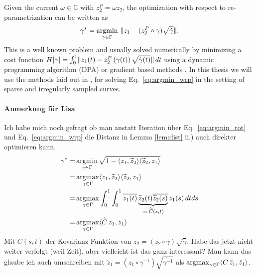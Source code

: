 Given the current $\omega \in \mathbb{C}$ with $z_2^P = \omega z_2$, the optimization with respect to re-parametrization can be written as
\begin{equation}
  \label{eq:argmin_wrp}
  \gamma^* = \operatorname*{argmin}_{\gamma \in \Gamma}\,\, \lVert z_1 - (z_2^P \circ \gamma) \sqrt{\dot\gamma}\rVert.
\end{equation}
This is a well known problem and usually solved numerically by minimizing a cost function $H[\gamma] = \int_0^1 \lVert z_1(t) - z_2^P\left( \gamma(t) \right) \sqrt{\dot\gamma(t)}\rVert\, dt$ using a dynamic programming algorithm (DPA) or gradient based methods \parencite[see][]{SrivastavaEtAl2011}.
In this thesis we will use the methods laid out in \cite{Steyer2021}, for solving Eq.\ \ref{eq:argmin_wrp} in the setting of sparse and irregularly sampled curves.

\paragraph{Anmerkung für Lisa}
Ich habe mich noch gefragt ob man anstatt Iteration über Eq.\ \ref{eq:argmin_rot} und Eq.\ \ref{eq:argmin_wrp} die Distanz in Lemma \ref{lem:dist} ii.) auch direkter optimieren kann.
\begin{align*}
  \gamma^* = & \operatorname*{argmin}_{\gamma \in \Gamma} \sqrt{1 - \langle z_1, \widetilde z_2 \rangle \langle \widetilde z_2, z_1 \rangle } \\
    = & \operatorname*{argmax}_{\gamma \in \Gamma} \langle z_1, \widetilde z_2 \rangle \langle \widetilde z_2, z_1 \rangle \\
    = & \operatorname*{argmax}_{\gamma \in \Gamma} \int_0^1 \int_0^1
    \overline{z_1(t)} \underbrace{\widetilde z_2(t) \overline{\widetilde z_2(s)}}_{\coloneqq \, {\widetilde C}(s,t)} z_1(s) \, dt ds \\
    = & \operatorname*{argmax}_{\gamma \in \Gamma} \langle \widetilde C \, z_1, z_1 \rangle
\end{align*}
Mit $\widetilde C(s,t)$ der Kovarianz-Funktion von $\widetilde z_2 = (z_2 \circ \gamma) \sqrt{\dot\gamma}$.
Habe das jetzt nicht weiter verfolgt (weil Zeit), aber vielleicht ist das ganz interessant?
Man kann das glaube ich auch umschreiben mit $\breve z_1 = (z_1 \circ \gamma^{-1}) \sqrt{\dot{\gamma^{-1}}}$ als $\operatorname*{argmax}_{\gamma \in \Gamma} \langle C \, \breve z_1, \breve z_1 \rangle$.



